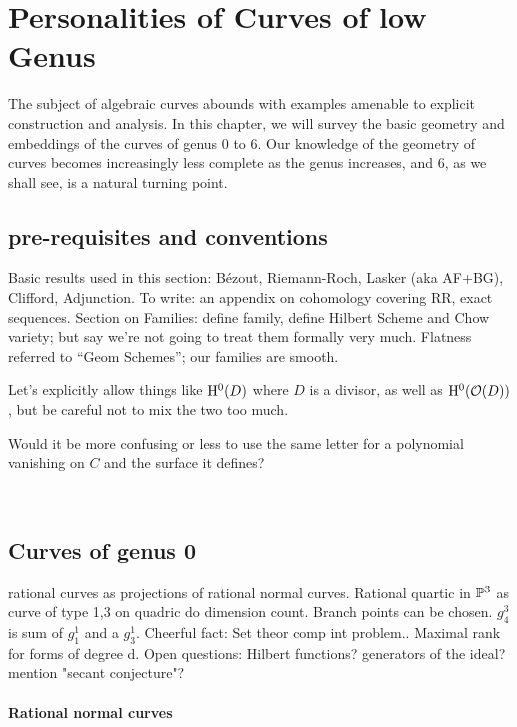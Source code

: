 

\chapter{Personalities of Curves of low Genus}

The subject of algebraic curves abounds with examples amenable to explicit construction and analysis. In this chapter, we will survey the basic geometry and embeddings of the curves of genus 0 to  6. Our knowledge of the geometry of curves becomes increasingly less complete as the genus increases, and 6, as we shall see, is a natural turning point. 
\section{pre-requisites and conventions}


Basic results used in this section: B\'ezout, Riemann-Roch, Lasker (aka AF+BG), Clifford, Adjunction.
To write: an appendix on cohomology covering RR, exact sequences.
Section on Families: define family, define Hilbert Scheme and Chow variety;  but say we're not going to treat them formally very much. Flatness referred to ``Geom Schemes''; our families are smooth.


Let's explicitly allow things like $\HH^0(D)$ where $D$ is a divisor, as well as $\HH^0(\cO(D))$, but be careful not to mix the two too much.

Would it be more confusing or less to use the same letter for a polynomial vanishing on $C$ and the surface it defines?

\




\section{Curves of genus 0} 

rational curves as projections of rational normal curves. Rational quartic in $\PP^3$ as curve of type 1,3 on quadric do dimension count. Branch points can be chosen. $g^3_4$ is sum of $g^1_1$ and a $g^1_3$. Cheerful fact: Set theor comp int problem.. Maximal rank for forms of degree d. Open questions: Hilbert functions? generators of the ideal? mention "secant conjecture"?

\subsubsection{Rational normal curves}

